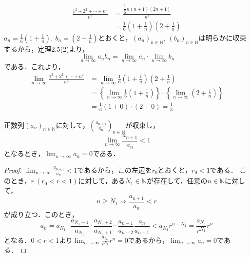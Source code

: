 \begin{tanswer}
    \begin{align*}
        \frac{1^2+2^2+\cdots+n^2}{n^3} & = \frac{\dfrac{1}{6}n(n+1)(2n+1)}{n^3}                                \\
                                       & =\frac{1}{6} \left(1+\frac{1}{n} \right ) \left(2+\frac{1}{n} \right)
    \end{align*}
    $a_n = \frac{1}{6} \left(1+\frac{1}{n} \right ),~b_n = \left(2+\frac{1}{n} \right)$とおくと，$(a_n)_{n \in \mathbb{N}},~(b_n)_{n \in \mathbb{N}}$は明らかに収束するから，定理2.5(2)より，
    \[
        \lim_{n \to \infty} a_n b_n = \lim_{n \to \infty} a_n \cdot  \lim_{n \to \infty} b_n
    \]
    である．これより，
    \begin{align*}
        \lim_{n \to \infty} \frac{1^2+2^2+\cdots+n^2}{n^3} & = \lim_{n \to \infty} \frac{1}{6} \left(1+\frac{1}{n} \right ) \left(2+\frac{1}{n} \right)                                                                \\
                                                           & = \left \{\lim_{n \to \infty} \frac{1}{6} \left(1+\frac{1}{n} \right ) \right \} \cdot \left \{\lim_{n \to \infty} \left(2+\frac{1}{n} \right ) \right \} \\
                                                           & = \frac{1}{6} (1+0) \cdot (2+0) =\frac{1}{3}
    \end{align*}
\end{tanswer}



\begin{lemma}{}{}
    正数列$(a_n)_{n \in \mathbb{N}}$に対して，$\left(\frac{a_{n+1}}{a_n} \right)_{n \in \mathbb{N}}$が収束し，
    \[
        \lim_{n \to \infty} \frac{a_{n+1}}{a_n} <1
    \]
    となるとき，$\lim_{n \to \infty} a_n =0$である．
\end{lemma}
\begin{proof}
    $ \lim_{n \to \infty} \frac{a_{n+1}}{a_n} <1$であるから，この左辺を$r_0$とおくと，$r_0<1$である．
    このとき，$r~(r_0<r<1)$に対して，ある$N_1 \in \mathbb{N}$が存在して，任意の$n \in \mathbb{N}$に対して，
    \[
        n \ge N_1 \Longrightarrow \frac{a_{n+1}}{a_n}<r
    \]
    が成り立つ．このとき，
    \[
        a_n = a_{N_1} \cdot \frac{a_{N_1+1}}{a_{N_1}} \cdot \frac{a_{N_1 +2}}{a_{N_1 +1}} \dotsm \frac{a_{n-1}}{a_{n-2}} \frac{a_n}{a_{n-1}}< a_{N_1} r^{n-N_1}=\frac{a_{N_1}}{r^{N_1}} r^n
    \]
    となる．$0<r<1$より$\lim_{n \to \infty} \frac{a_{N_1}}{r^{N_1}} r^n =0$であるから，$\lim_{n \to \infty} a_n =0$である．
\end{proof}


